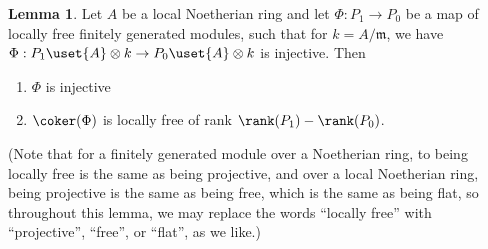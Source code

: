 \documentclass[12 pt]{article}
\theoremstyle{definition}
\newtheorem{lemma}[theorem]{Lemma}
\begin{document}
\begin{lemma} Let $A$ be a local Noetherian ring and let $\Phi:P_1 \to P_0$ be a map of locally free finitely generated modules, such that for $k=A/\mathfrak{m}$, we have $\Phi: P_1 \uset{A}\otimes k \to P_0 \uset{A}\otimes k$ is injective. Then
\begin{enumerate}
\item $\Phi$ is injective
\item $\coker(\Phi)$ is locally free of rank $\rank(P_1)-\rank(P_0)$.
\end{enumerate}

(Note that for a finitely generated module over a Noetherian ring, to being locally free is the same as being projective, and over a local Noetherian ring, being projective is the same as being free, which is the same as being flat, so throughout this lemma, we may replace the words ``locally free'' with ``projective'', ``free'', or ``flat'', as we like.)
\label{phi inj mod m means phi inj}
\end{lemma}
\end{document}
